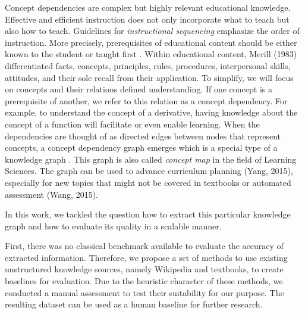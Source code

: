 \documentclass{article}
\begin{document}
Concept dependencies are complex but highly relevant educational knowledge. Effective and efficient instruction does not only incorporate what to teach but also how to teach. Guidelines for \textit{instructional sequencing} emphasize the order of instruction. More precisely, prerequisites of educational content should be either known to the student or taught first \citep{morrison2019designing}.
Within educational content, Merill (1983) differentiated facts, concepts, principles, rules, procedures, interpersonal skills, attitudes, and their sole recall from their application. To simplify, we will focus on concepts and their relations defined understanding. 
If one concept is a prerequisite of another, we refer to this relation as a concept dependency. For example, to understand the concept of a derivative, having knowledge about the concept of a function will facilitate or even enable learning. When the dependencies are thought of as directed edges between nodes that represent concepts, a concept dependency graph emerges which is a special type of a knowledge graph \citep{wang2016using}. This graph is also called \textit{concept map} in the field of Learning Sciences.
The graph can be used to advance curriculum planning (Yang, 2015), especially for new topics that might not be covered in textbooks or automated assessment (Wang, 2015).

In this work, we tackled the question how to extract this particular knowledge graph and how to evaluate its quality in a scalable manner.

First, there was no classical benchmark available to evaluate the accuracy of extracted information. Therefore, we propose a set of methods to use existing unstructured knowledge sources, namely Wikipedia and textbooks, to create baselines for evaluation. Due to the heuristic character of these methods, we conducted a manual assessment to test their suitability for our purpose. The resulting dataset can be used as a human baseline for further research.
\end{document}
